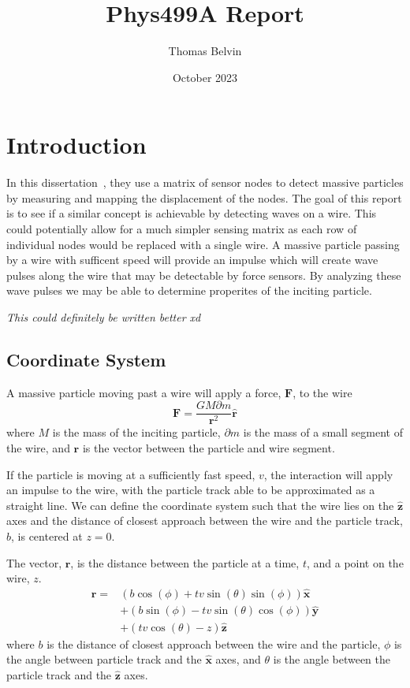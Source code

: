 \documentclass{report}
\title{Phys499A Report}
\author{Thomas Belvin}
\date{October 2023}
\begin{document}
\maketitle
\chapter*{Introduction}
In this dissertation~\cite{Gosh2023}, they use a matrix of sensor nodes to detect massive particles by measuring and mapping the displacement of the nodes.
The goal of this report is to see if a similar concept is achievable by detecting waves on a wire.
This could potentially allow for a much simpler sensing matrix as each row of individual nodes would be replaced with a single wire.
A massive particle passing by a wire with sufficent speed will provide an impulse which will create wave pulses along the wire that may be detectable by force sensors. 
By analyzing these wave pulses we may be able to determine properites of the inciting particle.

\emph{This could definitely be written better xd}
\section*{Coordinate System}
A massive particle moving past a wire will apply a force, $\mathbf{F}$, to the wire 
\begin{equation}
    \mathbf{F} = \frac{G M \partial m}{\mathbf{r}^2} \mathbf{\hat r}
    \label{eqn:force}
\end{equation}
where $M$ is the mass of the inciting particle, $\partial m$ is the mass of a small segment of the wire, and $\mathbf{r}$ is the vector between the particle and wire segment.

If the particle is moving at a sufficiently fast speed, $v$, the  interaction will apply an impulse to the wire, with the particle track able to be approximated as a straight line. 
We can define the coordinate system such that the wire lies on the $\mathbf{\hat z}$ axes and the distance of closest approach between the wire and the particle track, $b$, is centered at $z = 0$.

The vector, $\mathbf{r}$, is the distance between the particle at a time, $t$, and a point on the wire, $z$.
\begin{align}
    \nonumber \mathbf{r}=& (b \cos (\phi )+t v \sin (\theta ) \sin (\phi )) \mathbf{\hat x} \\
               \nonumber & +(b \sin (\phi )-t v \sin (\theta ) \cos (\phi )) \mathbf{\hat y}\\
                         & + (t v \cos (\theta )-z) \mathbf{\hat z}
    \label{eqn:r}
\end{align}
where $b$ is the distance of closest approach between the wire and the particle, $\phi$ is the angle between particle track and the $\mathbf{\hat x}$ axes, and $\theta$ is the angle between the particle track and the $\mathbf{\hat z}$ axes.
\end{document}
